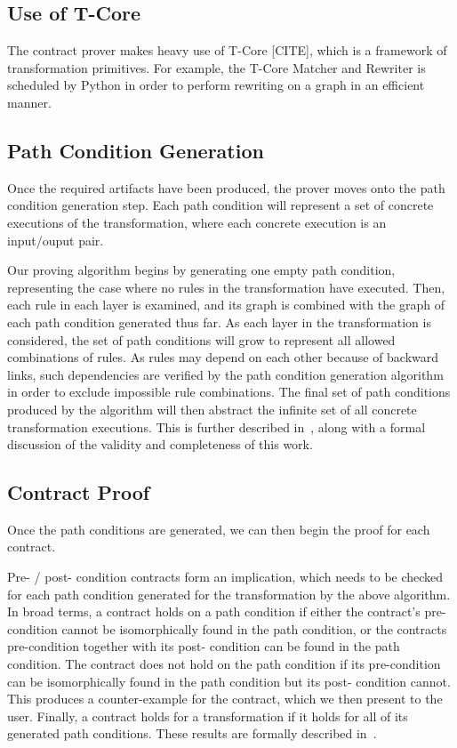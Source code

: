 \subsection{Use of T-Core}

The contract prover makes heavy use of T-Core [CITE], which is a framework of transformation primitives. For example, the T-Core Matcher and Rewriter is scheduled by Python in order to perform rewriting on a graph in an efficient manner.


\subsection{Path Condition Generation}

Once the required artifacts have been produced, the prover moves onto the path condition generation step.  Each
path condition will represent a set of concrete executions
of the transformation, where each concrete execution is an
input/ouput pair.

Our proving algorithm begins by generating one empty
path condition, representing the case where no rules in the
transformation have executed. Then, each rule in each layer
is examined, and its graph is combined with the graph of
each path condition generated thus far. As each layer in the
transformation is considered, the set of path conditions will
grow to represent all allowed combinations of rules. As rules
may depend on each other because of backward links, such
dependencies are verified by the path condition generation
algorithm in order to exclude impossible rule combinations.
The final set of path conditions produced by the algorithm
will then abstract the infinite set of all concrete transformation
executions. This is further described in~\cite{Lucio2014}, along with a
formal discussion of the validity and completeness of this
work.

\subsection{Contract Proof}

Once the path conditions are generated, we can then begin the proof for each contract.

Pre- / post- condition contracts form an implication, which
needs to be checked for each path condition generated for
the transformation by the above algorithm. In broad terms,
a contract holds on a path condition if either the contract’s
pre-condition cannot be isomorphically found in the path
condition, or the contracts pre-condition together with its post-
condition can be found in the path condition. The contract
does not hold on the path condition if its pre-condition can
be isomorphically found in the path condition but its post-
condition cannot. This produces a counter-example for the contract, which we then present to the user. Finally, a contract holds for a transformation if it holds for all of its generated path conditions. These results
are formally described in~\cite{Lucio2014}.

